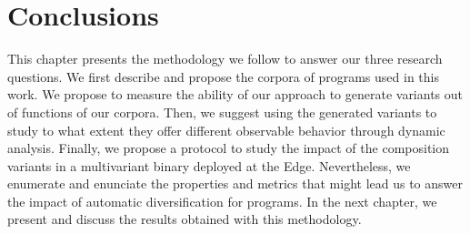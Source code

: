 







\section{Conclusions}

This chapter presents the methodology we follow to answer our three research questions. We first describe and propose the corpora of programs used in this work. We propose to measure the ability of our approach to generate variants out of  functions of our corpora. Then, we suggest using the generated variants to study to what extent they offer different observable behavior through dynamic analysis. Finally, we propose a protocol to study the impact of the composition variants in a multivariant binary deployed at the Edge. Nevertheless, we enumerate and enunciate the properties and metrics that might lead us to answer the impact of automatic diversification for \wasm programs. In the next chapter, we present and discuss the results obtained with this methodology.

\clearpage
